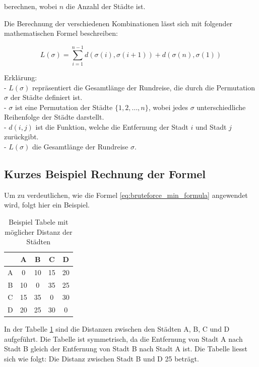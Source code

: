 berechnen, wobei \(n\) die Anzahl der Städte ist.

Die Berechnung der verschiedenen Kombinationen lässt sich mit folgender 
mathematischen Formel beschreiben:

\begin{equation}
    \label{eq:bruteforce_min_formula}
    L(\sigma) = \sum_{i=1}^{n-1} d(\sigma(i), \sigma(i+1)) + d(\sigma(n), \sigma(1))
\end{equation}

Erklärung:\\
- \( L(\sigma) \)  repräsentiert die Gesamtlänge der Rundreise, die durch 
die Permutation \( \sigma \) der Städte definiert ist.\\
- \( \sigma \) ist eine Permutation der Städte \( \{1, 2, \ldots, n\} \),
wobei jedes \( \sigma \) unterschiedliche Reihenfolge der Städte darstellt.\\
- \( d(i, j) \) ist die Funktion, welche die Entfernung der Stadt \( i \) und 
Stadt \( j \) zurückgibt.\\
- \( L(\sigma) \) die Gesamtlänge der Rundreise \( \sigma \).\\

\subsection{Kurzes Beispiel Rechnung der Formel
\label{variationsprinzip_algorithmen:section:bruteforce_calculate}}
Um zu verdeutlichen, wie die Formel \ref{eq:bruteforce_min_formula}
angewendet wird, folgt hier ein Beispiel.

\begin{table}[h]
    \centering
    \begin{tabular}{|c|c|c|c|c|}
        \hline
          & A  & B  & C  & D  \\ \hline
        A & 0  & 10 & 15 & 20 \\ \hline
        B & 10 & 0  & 35 & 25 \\ \hline
        C & 15 & 35 & 0  & 30 \\ \hline
        D & 20 & 25 & 30 & 0  \\ \hline
    \end{tabular}
    \caption{Beispiel Tabele mit möglicher Distanz der Städten}
    \label{tab:example_bruteforce_cities}
\end{table}

In der Tabelle \ref{tab:example_bruteforce_cities} sind die Distanzen 
zwischen den Städten A, B, C und D aufgeführt. Die Tabelle ist symmetrisch, 
da die Entfernung von Stadt A nach Stadt B gleich der Entfernung von 
Stadt B nach Stadt A ist.
Die Tabelle liesst sich wie folgt: Die Distanz zwischen Stadt B und D 25 beträgt.

